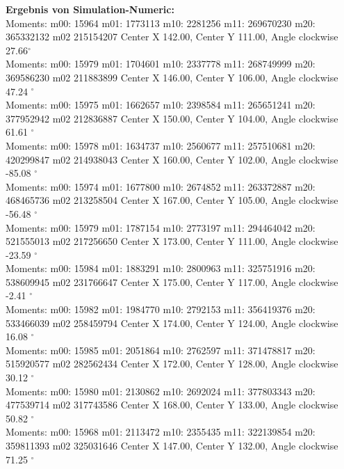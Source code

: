 \documentclass[a4paper]{report}
\begin{document}
\begin{tcolorbox}
\textbf{Ergebnis von Simulation-Numeric:}\\
{\small
Moments: m00: 15964 m01: 1773113 m10: 2281256 m11: 269670230 m20: 365332132 m02 215154207
Center X 142.00, Center Y 111.00, Angle clockwise 27.66$^\circ$ \\

Moments: m00: 15979 m01: 1704601 m10: 2337778 m11: 268749999 m20: 369586230 m02 211883899
Center X 146.00, Center Y 106.00, Angle clockwise 47.24 $^\circ$ \\	

Moments: m00: 15975 m01: 1662657 m10: 2398584 m11: 265651241 m20: 377952942 m02 212836887
Center X 150.00, Center Y 104.00, Angle clockwise 61.61 $^\circ$ \\

Moments: m00: 15978 m01: 1634737 m10: 2560677 m11: 257510681 m20: 420299847 m02 214938043
Center X 160.00, Center Y 102.00, Angle clockwise -85.08 $^\circ$ \\

Moments: m00: 15974 m01: 1677800 m10: 2674852 m11: 263372887 m20: 468465736 m02 213258504
Center X 167.00, Center Y 105.00, Angle clockwise -56.48 $^\circ$ \\

Moments: m00: 15979 m01: 1787154 m10: 2773197 m11: 294464042 m20: 521555013 m02 217256650
Center X 173.00, Center Y 111.00, Angle clockwise -23.59 $^\circ$ \\

Moments: m00: 15984 m01: 1883291 m10: 2800963 m11: 325751916 m20: 538609945 m02 231766647
Center X 175.00, Center Y 117.00, Angle clockwise -2.41 $^\circ$ \\

Moments: m00: 15982 m01: 1984770 m10: 2792153 m11: 356419376 m20: 533466039 m02 258459794
Center X 174.00, Center Y 124.00, Angle clockwise 16.08 $^\circ$ \\

Moments: m00: 15985 m01: 2051864 m10: 2762597 m11: 371478817 m20: 515920577 m02 282562434
Center X 172.00, Center Y 128.00, Angle clockwise 30.12 $^\circ$ \\

Moments: m00: 15980 m01: 2130862 m10: 2692024 m11: 377803343 m20: 477539714 m02 317743586
Center X 168.00, Center Y 133.00, Angle clockwise 50.82 $^\circ$ \\

Moments: m00: 15968 m01: 2113472 m10: 2355435 m11: 322139854 m20: 359811393 m02 325031646
Center X 147.00, Center Y 132.00, Angle clockwise 71.25 $^\circ$ \\

}
\end{tcolorbox}
\end{document}
